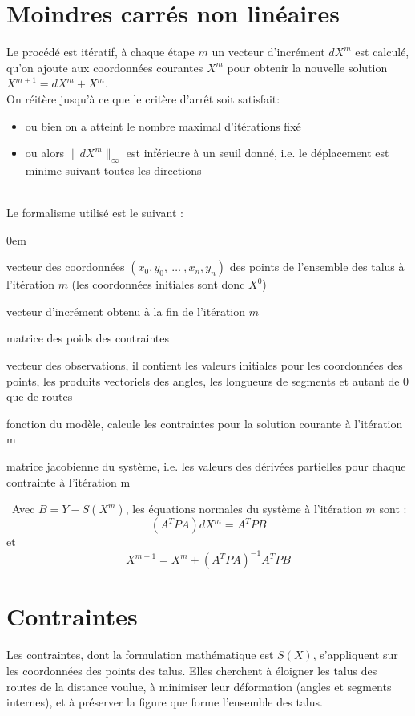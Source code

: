 \documentclass[11pt]{article}
\begin{document}
\section{Moindres carrés non linéaires}
\label{lsq}
Le procédé est itératif, à chaque étape $m$ un vecteur d'incrément $dX^m$ est calculé, qu'on ajoute aux coordonnées courantes $X^{m}$ pour obtenir la nouvelle solution $X^{m+1} = dX^m+X^{m}$.
\
\\
On réitère jusqu'à ce que le critère d'arrêt soit satisfait: 
\begin{itemize}
\item ou bien on a atteint le nombre maximal d'itérations fixé
\item ou alors $\lVert dX^m \rVert_{\infty}$ est inférieure à un seuil donné, i.e. le déplacement est minime suivant toutes les directions
\end{itemize}
\
\\
Le formalisme utilisé est le suivant :
\begin{description}
\addtolength{\itemindent}{0.80cm}
\itemsep0em 
\item[$X^m$] vecteur des coordonnées $(x_0, y_0,\ \dots \ , x_n, y_n)$ des points de l'ensemble des talus à l'itération $m$ (les coordonnées initiales sont donc $X^0$)
\item[$dX^m$] vecteur d'incrément obtenu à la fin de l'itération $m$
\item[$P$] matrice des poids des contraintes
\item[$Y$] vecteur des observations, il contient les valeurs initiales pour les coordonnées des points, les produits vectoriels des angles, les longueurs de segments et autant de 0 que de routes
\item[$S(X^m)$] fonction du modèle, calcule les contraintes pour la solution courante à l'itération m 
\item[$A$] matrice jacobienne du système, i.e. les valeurs des dérivées partielles pour chaque contrainte à l'itération m 
\end{description}
\
Avec $ B = Y - S(X^m)$, les équations normales du système à l'itération $m$  sont :
\begin{displaymath}
(A^TPA) dX^m = A^TPB
\end{displaymath}
 et 
\begin{displaymath}
X^{m+1} = X^m + (A^TPA)^{-1} A^TPB
\end{displaymath}

\section{Contraintes}
Les contraintes, dont la formulation mathématique est $S(X)$, s'appliquent sur les coordonnées des points des talus. Elles cherchent à éloigner les talus des routes de la distance voulue, à minimiser leur déformation (angles et segments internes), et à préserver la figure que forme l'ensemble des talus. 
\end{document}
